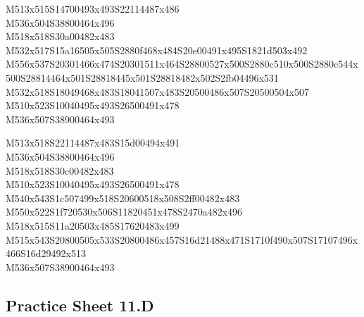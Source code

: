 \documentclass{article}
\begin{document}
\begin{multicols}{5}
\begin{center}
M513x515S14700493x493S22114487x486 %
\\M536x504S38800464x496 %
\\M518x518S30a00482x483 %
\\M532x517S15a16505x505S2880f468x484S20e00491x495S1821d503x492 %
\\M556x537S20301466x474S20301511x464S28800527x500S2880c510x500S2880c544x500S28814464x501S28818445x501S28818482x502S2fb04496x531 %
\\M532x518S18049468x483S18041507x483S20500486x507S20500504x507 %
\\M510x523S10040495x493S26500491x478 %
\\M536x507S38900464x493 %
\vfil
\columnbreak

M513x518S22114487x483S15d00494x491 %
\\M536x504S38800464x496 %
\\M518x518S30c00482x483 %
\\M510x523S10040495x493S26500491x478 %
\\M540x543S1c507499x518S20600518x508S2ff00482x483 %
\\M550x522S1f720530x506S11820451x478S2470a482x496 %
\\M518x515S11a20503x485S17620483x499 %
\\M515x543S20800505x533S20800486x457S16d21488x471S1710f490x507S17107496x466S16d29492x513 %
\\M536x507S38900464x493 %
\vfil

\end{center}
\end{multicols}

\subsection{Practice Sheet 11.D}
\end{document}
